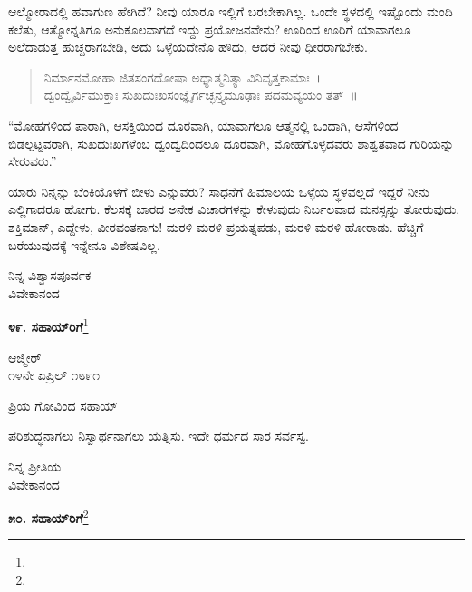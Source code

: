 ಆಲ್ಮೋರಾದಲ್ಲಿ ಹವಾಗುಣ ಹೇಗಿದೆ? ನೀವು ಯಾರೂ ಇಲ್ಲಿಗೆ ಬರಬೇಕಾಗಿಲ್ಲ. ಒಂದೇ ಸ್ಥಳದಲ್ಲಿ ಇಷ್ಟೊಂದು ಮಂದಿ ಕಲೆತು, ಆತ್ಮೋನ್ನತಿಗೂ ಅನುಕೂಲವಾಗದೆ ಇದ್ದು ಪ್ರಯೋಜನವೇನು? ಊರಿಂದ ಊರಿಗೆ ಯಾವಾಗಲೂ ಅಲೆದಾಡುತ್ತ ಹುಚ್ಚರಾಗಬೇಡಿ, ಅದು ಒಳ್ಳೆಯದೇನೊ ಹೌದು, ಆದರೆ ನೀವು ಧೀರರಾಗಬೇಕು.
\begin{verse}
 ನಿರ್ಮಾನಮೋಹಾ ಜಿತಸಂಗದೋಷಾ ಅಧ್ಯಾತ್ಮನಿತ್ಯಾ ವಿನಿವೃತ್ತಕಾಮಾಃ~।\\
 ದ್ವಂದ್ವೈರ್ವಿಮುಕ್ತಾಃ ಸುಖದುಃಖಸಂಜ್ಞೈರ್ಗಚ್ಛನ್ತ್ಯಮೂಢಾಃ ಪದಮವ್ಯಯಂ ತತ್~॥ 
\end{verse}


“ಮೋಹಗಳಿಂದ ಪಾರಾಗಿ, ಆಸಕ್ತಿಯಿಂದ ದೂರವಾಗಿ, ಯಾವಾಗಲೂ ಆತ್ಮನಲ್ಲಿ ಒಂದಾಗಿ, ಆಸೆಗಳಿಂದ ಬಿಡಲ್ಪಟ್ಟವರಾಗಿ, ಸುಖದುಃಖಗಳೆಂಬ ದ್ವಂದ್ವದಿಂದಲೂ ದೂರವಾಗಿ, ಮೋಹಗೊಳ್ಳದವರು ಶಾಶ್ವತವಾದ ಗುರಿಯನ್ನು ಸೇರುವರು.”

ಯಾರು ನಿನ್ನನ್ನು ಬೆಂಕಿಯೊಳಗೆ ಬೀಳು ಎನ್ನುವರು? ಸಾಧನೆಗೆ ಹಿಮಾಲಯ ಒಳ್ಳೆಯ ಸ್ಥಳವಲ್ಲದೆ ಇದ್ದರೆ ನೀನು ಎಲ್ಲಿಗಾದರೂ ಹೋಗು. ಕೆಲಸಕ್ಕೆ ಬಾರದ ಅನೇಕ ವಿಚಾರಗಳನ್ನು ಕೇಳುವುದು ನಿರ್ಬಲವಾದ ಮನಸ್ಸನ್ನು ತೋರುವುದು. ಶಕ್ತಿಮಾನ್, ಎದ್ದೇಳು, ವೀರವಂತನಾಗು! ಮರಳಿ ಮರಳಿ ಪ್ರಯತ್ನಪಡು, ಮರಳಿ ಮರಳಿ ಹೋರಾಡು. ಹೆಚ್ಚಿಗೆ ಬರೆಯುವುದಕ್ಕೆ ಇನ್ನೇನೂ ವಿಶೇಷವಿಲ್ಲ.

{\flushright
ನಿನ್ನ ವಿಶ್ವಾಸಪೂರ್ವಕ\\ವಿವೇಕಾನಂದ\par}

\newpage
\begin{center}
\textbf{೪೯. ಸಹಾಯ್‌ರಿಗೆ}\footnote{}
\end{center}

\vspace{-0.65cm}

\begin{flushright}
ಆಜ್ಮೀರ್\\೧೪ನೇ ಏಪ್ರಿಲ್ ೧೮೯೧
\end{flushright}

\noindent
ಪ್ರಿಯ ಗೋವಿಂದ ಸಹಾಯ್

ಪರಿಶುದ್ಧನಾಗಲು ನಿಸ್ವಾರ್ಥನಾಗಲು ಯತ್ನಿಸು. ಇದೇ ಧರ್ಮದ ಸಾರ ಸರ್ವಸ್ವ.

\vspace{-0.25cm}

{\flushright
ನಿನ್ನ ಪ್ರೀತಿಯ\\ವಿವೇಕಾನಂದ\par}

\begin{center}
\textbf{೫೦. ಸಹಾಯ್‌ರಿಗೆ}\footnote{}
\end{center}

\vspace{-0.5cm}

